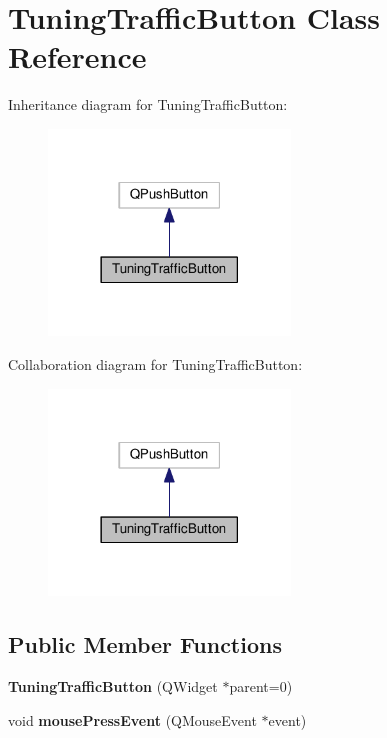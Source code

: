 \hypertarget{class_tuning_traffic_button}{}\section{Tuning\+Traffic\+Button Class Reference}
\label{class_tuning_traffic_button}


Inheritance diagram for Tuning\+Traffic\+Button\+:
\nopagebreak
\begin{figure}[H]
\begin{center}
\leavevmode
\includegraphics[width=182pt]{class_tuning_traffic_button__inherit__graph}
\end{center}
\end{figure}


Collaboration diagram for Tuning\+Traffic\+Button\+:
\nopagebreak
\begin{figure}[H]
\begin{center}
\leavevmode
\includegraphics[width=182pt]{class_tuning_traffic_button__coll__graph}
\end{center}
\end{figure}
\subsection*{Public Member Functions}
\begin{DoxyCompactItemize}
\item 
{\bfseries Tuning\+Traffic\+Button} (Q\+Widget $\ast$parent=0)\hypertarget{class_tuning_traffic_button_ab3b8fb86857944e8f08e8680c19d8532}{}\label{class_tuning_traffic_button_ab3b8fb86857944e8f08e8680c19d8532}

\item 
void {\bfseries mouse\+Press\+Event} (Q\+Mouse\+Event $\ast$event)\hypertarget{class_tuning_traffic_button_a514d33da65a5cfbc090d3e5ce766fa1b}{}\label{class_tuning_traffic_button_a514d33da65a5cfbc090d3e5ce766fa1b}

\end{DoxyCompactItemize}


